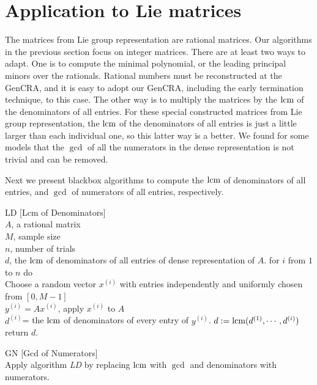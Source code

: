 \section {Application to Lie matrices}
The matrices from Lie group representation are rational matrices.
Our algorithms in the previous section focus on integer matrices.
There are at least two ways to adapt.
One is to compute the minimal polynomial, or the leading principal minors
over the rationals.
Rational numbers must be reconstructed at the GenCRA,
and it is easy to adopt our GenCRA, including the early termination technique,
to this case.
The other way is to multiply the matrices by the $\mbox{lcm}$ of
the denominators of all entries.
For these special constructed matrices from Lie group representation, 
the $\mbox{lcm}$ of the denominators of all entries
is just a little larger than each individual one,
so this latter way is a better.
We found for some models that the $\gcd$ of all the
numerators in the dense representation is not trivial and  can be removed.

Next we present blackbox algorithms to compute the
$\mbox{lcm}$ of denominators of all entries, 
and $\gcd$ of numerators of all entries,
respectively.
\begin{algorithm} {LD [Lcm of Denominators]}
\Inspec \\
$A$, a rational matrix\\
$M$, sample size\\
$n$, number of trials
\Outspec \\
$d$, the $\mbox{lcm}$ of denominators of all entries of dense representation of $A$.
\Stmt[1.]
for $i$ from $1$ to $n$ do\\
Choose a random vector $x^{(i)}$ with entries independently and uniformly chosen
from $[0, M-1]$\\
$y^{(i)} = A x^{(i)}$, apply $x^{(i)}$ to $A$\\
$d^{(i)}$= the $\mbox{lcm}$ of denominators of every entry of $y^{(i)}$.
\Stmt[2.]
$d := \mbox{lcm} (d^{(1)}, \cdots, d^{(i)})$
\Stmt[3.]
return $d$.
\end{algorithm}

\begin{algorithm}{GN [Gcd of Numerators]}
\\Apply algorithm {\em LD} by replacing $\mbox{lcm}$ with $\gcd$ and 
denominators with numerators.
\end{algorithm}

